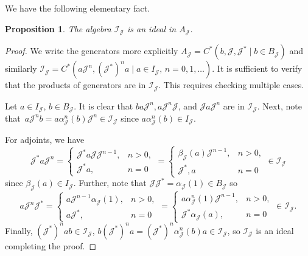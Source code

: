 \documentclass[pdftex]{sigma}
\newcommand{\jcal}{{\mathcal J}}
\newcommand{\fancyJ}{\mathcal{J}}
\numberwithin{equation}{section}
\newtheorem{Proposition}[Theorem]{Proposition}
 { \theoremstyle{definition}
\newtheorem{Definition}[Theorem]{Definition}
\newtheorem{Note}[Theorem]{Note}
\newtheorem{Example}[Theorem]{Example}
\newtheorem{Remark}[Theorem]{Remark} }
\begin{document}
We have the following elementary fact.
\begin{Proposition}
The algebra $\mathcal{I}_\jcal$ is an ideal in $A_\jcal$.
\end{Proposition}
\begin{proof}
We write the generators more explicitly $A_\jcal = C^*(b,\jcal, \jcal^*\mid b\in B_\jcal)$ and similarly $\mathcal{I}_\jcal = C^*(a\jcal^n, (\jcal^*)^n a\mid a\in I_\jcal,\, n=0,1,\dots)$. It is sufficient to verify that the products of generators are in $\mathcal{I}_\jcal$. This requires checking multiple cases.

Let $a\in I_\jcal$, $b\in B_\jcal$. It is clear that $ba\jcal^n, a\jcal^n \jcal$, and $\jcal a\jcal^n$ are in $\mathcal{I}_\jcal$.
Next, note that~${a \jcal^n b = a \alpha_\jcal^n(b)\jcal^n\in \mathcal{I}_\jcal}$ since $a\alpha_\jcal^n(b)\in I_\jcal$.

For adjoints, we have
\begin{equation*}
\jcal^* a \jcal^n = \begin{cases}
\jcal^* a \jcal \jcal^{n-1}, & n>0, \\ \jcal^* a, & n=0
\end{cases}
= \begin{cases}
\beta_\jcal(a)\jcal^{n-1}, & n>0, \\ \jcal^*, a & n=0
\end{cases} \in \mathcal{I}_\jcal
\end{equation*}
since $\beta_\fancyJ(a)\in I_\fancyJ$. Further, note that $\jcal \jcal^* = \alpha_\jcal(1) \in B_\jcal$ so
\begin{equation*}
a\jcal^n \jcal^* = \begin{cases}
a \jcal^{n-1}\alpha_\jcal(1), & n>0, \\ a\jcal^*, & n=0
\end{cases} = \begin{cases}
a\alpha_\jcal^n(1)\jcal^{n-1}, & n>0, \\ \jcal^* \alpha_\jcal(a), & n=0
\end{cases} \in \mathcal{I}_\jcal.
\end{equation*}
Finally, $(\jcal^*)^n ab\in \mathcal{I}_\jcal$, $b(\jcal^*)^na = (\jcal^*)^n\alpha_\jcal^n(b)a \in \mathcal{I}_\jcal$,
so $\mathcal{I}_\jcal$ is an ideal completing the proof.
\end{proof}
\end{document}
